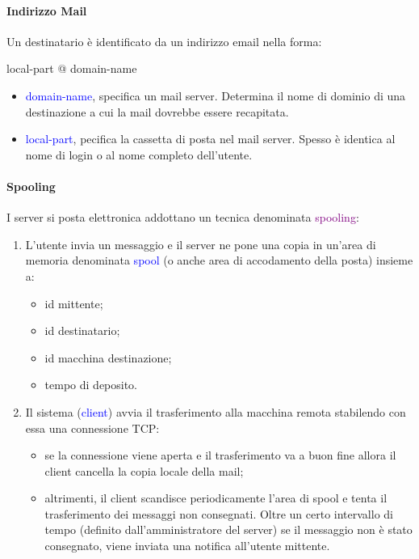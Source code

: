 \paragraph{Indirizzo Mail}
Un destinatario è identificato da un indirizzo email nella forma:
\begin{center}
    local-part @ domain-name
\end{center}
\begin{itemize}
    \item \textcolor{blue}{domain-name}, specifica un mail server. Determina il nome di dominio di una destinazione a cui la mail dovrebbe essere recapitata.
    \item \textcolor{blue}{local-part}, pecifica la cassetta di posta nel mail server. Spesso è identica al nome di login o al nome completo dell’utente.
\end{itemize}

\paragraph{Spooling} I server si posta elettronica addottano un tecnica denominata \textcolor{purple}{spooling}:
\begin{enumerate}
    \item L'utente invia un messaggio e il server ne pone una copia in un'area di memoria denominata \textcolor{blue}{spool} (o anche area di accodamento della posta) insieme a:
        \begin{itemize}
            \item id mittente;
            \item id destinatario;
            \item id macchina destinazione;
            \item tempo di deposito.
        \end{itemize}
    \item Il sistema (\textcolor{blue}{client}) avvia il trasferimento alla macchina remota stabilendo con essa una connessione TCP:
        \begin{itemize}
            \item se la connessione viene aperta e il trasferimento va a buon fine allora il client cancella la copia locale della mail;
            \item altrimenti, il client scandisce periodicamente l'area di spool e tenta il trasferimento dei messaggi non consegnati. Oltre un certo intervallo di tempo (definito dall’amministratore del server) se il messaggio non è stato consegnato, viene inviata una notifica all’utente mittente.
        \end{itemize}
\end{enumerate}

